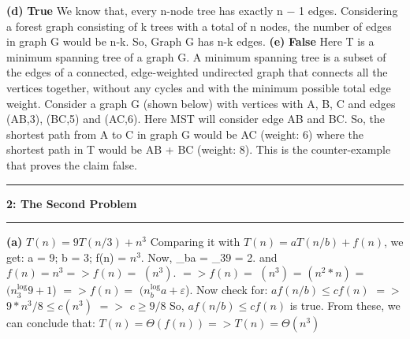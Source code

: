 \documentclass[11pt]{article}
\newcommand\question[2]{\vspace{.25in}\hrule\textbf{#1: #2}\vspace{.5em}\hrule\vspace{.10in}}
\renewcommand\part[1]{\vspace{.10in}\textbf{(#1)}}
\begin{document}
\part{d} \textbf{True}
\newline We know that, every n-node tree has exactly n − 1 edges. Considering a forest graph consisting of k trees with a total of n nodes, the number of edges in graph G would be n-k. So, Graph G has n-k edges. 
\newline 
\newline 
\part{e} \textbf{False}
\newline Here T is a minimum spanning tree of a graph G. A minimum spanning tree is a subset of the edges of a connected, edge-weighted undirected graph that connects all the vertices together, without any cycles and with the minimum possible total edge weight. Consider a graph G (shown below) with vertices with A, B, C and edges (AB,3), (BC,5) and (AC,6). Here MST will consider edge AB and BC. So, the shortest path from A to C in graph G would be AC (weight: 6) where the shortest path in T would be AB + BC (weight: 8). This is the counter-example that proves the claim false.

\begin {center}
\end{center}

\question{2}{The Second Problem}
\part{a} $T(n) = 9T(n/3)+n^3$ 
\newline Comparing it with $T(n) = a T(n/b)+ f(n)$, we get:  a = 9; b = 3; f(n) = $n^3$.
\newline Now, \log_{b}a = \log_{3}9 = 2. 
\newline and $ f(n) = n^3 => f(n) =$ \Theta $(n^3)$. 
\newline $=> f(n) =$ \Theta $(n^3)$ = \Theta $(n^2 * n)$ = \Theta $(n^\log_{3}9 + 1$)
\newline $=> f(n) =$ \Theta $(n^\log_{b}a + \varepsilon $). 
\newline Now check for: $a f(n/b) \le c f(n)$ 
\newline $=>$ $ 9 * n^3 /8 \le c (n^3)$ $=>$ $c \ge 9/8$
\newline So, $a f(n/b) \le c f(n)$ is true. 
\newline 
\newline From these, we can conclude that: $T(n)= \Theta (f(n)) => T(n) = \Theta (n^3)$
\end{document}
